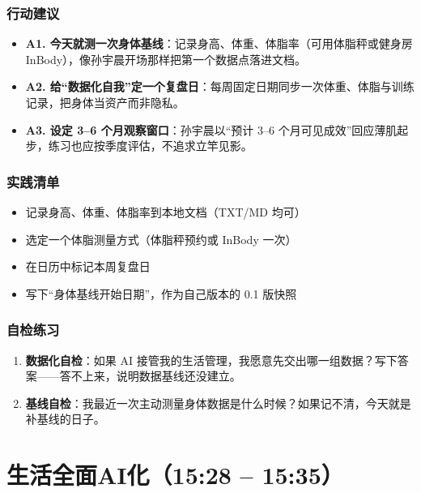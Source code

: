 \subsubsection{行动建议}

\begin{itemize}
\tightlist
\item
  \textbf{A1.
  今天就测一次身体基线}：记录身高、体重、体脂率（可用体脂秤或健身房
  InBody），像孙宇晨开场那样把第一个数据点落进文档。
\item
  \textbf{A2.
  给``数据化自我''定一个复盘日}：每周固定日期同步一次体重、体脂与训练记录，把身体当资产而非隐私。
\item
  \textbf{A3. 设定 3--6 个月观察窗口}：孙宇晨以``预计 3--6
  个月可见成效''回应薄肌起步，练习也应按季度评估，不追求立竿见影。
\end{itemize}

\subsubsection{实践清单}

\begin{itemize}
\tightlist
\item[$\square$]
  记录身高、体重、体脂率到本地文档（TXT/MD 均可）
\item[$\square$]
  选定一个体脂测量方式（体脂秤预约或 InBody 一次）
\item[$\square$]
  在日历中标记本周复盘日
\item[$\square$]
  写下``身体基线开始日期''，作为自己版本的 0.1 版快照
\end{itemize}

\subsubsection{自检练习}

\begin{enumerate}
\def\labelenumi{\arabic{enumi}.}
\tightlist
\item
  \textbf{数据化自检}：如果 AI
  接管我的生活管理，我愿意先交出哪一组数据？写下答案------答不上来，说明数据基线还没建立。
\item
  \textbf{基线自检}：我最近一次主动测量身体数据是什么时候？如果记不清，今天就是补基线的日子。
\end{enumerate}

\section{生活全面AI化（15:28 --
15:35）}

